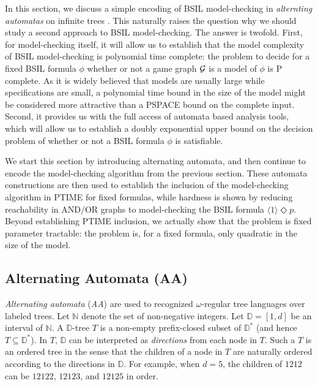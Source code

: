 \documentclass[11pt]{article}
\newcommand{\calg}{{\cal G}}
\newcommand{\pevt}{\Diamond}
\newcommand{\bbbbd}{{\mathbb D}}
\newcommand{\nnneg}{{\mathbb N}}
\begin{document}
In this section, we discuss a simple encoding of BSIL model-checking 
in {\em alternting automatas} on infinite trees 
\cite{Kirsten02,Zappe02}.  
This naturally raises the question why we should study 
a second approach to BSIL model-checking.
The answer is twofold.
First, for model-checking itself, 
it will allow us to establish that the model complexity 
of BSIL model-checking is polynomial time complete:
the problem to decide for a fixed BSIL formula $\phi$ whether 
or not a game graph $\calg$ is a model of $\phi$ is P complete.
As it is widely believed that models are usually large 
while specifications are small, a polynomial time bound in the size 
of the model might be considered more attractive than a PSPACE bound 
on the complete input.
Second, it provides us with the full access of automata 
based analysis tools, which will allow us to establish 
a doubly exponential upper bound on the decision problem of whether 
or not a BSIL formula $\phi$ is satisfiable.

We start this section by introducing alternating automata, 
and then continue to encode the model-checking algorithm 
from the previous section.
These automata constructions are then used to establish 
the inclusion of the model-checking algorithm in PTIME 
for fixed formulas, 
while hardness is shown by reducing reachability 
in AND/OR graphs \cite{Immerman81} to model-checking the BSIL formula 
$\langle 1 \rangle \pevt p$.
Beyond establishing PTIME inclusion, 
we actually show that the problem is fixed parameter tractable: 
the problem is, for a fixed formula, only quadratic in the size 
of the model.


\subsection{Alternating Automata (AA)}

{\em Alternating automata} ({\em AA}) are used 
to recognized $\omega$-regular 
tree languages over labeled trees.  
Let $\nnneg$ denote the set of non-negative integers.  
Let $\bbbbd=[1,d]$ be an interval of $\nnneg$.   
A $\bbbbd$-tree $T$ is a non-empty prefix-closed subset of $\bbbbd^*$ 
(and hence $T \subseteq \bbbbd^*$).  
In $T$, $\bbbbd$ can be interpreted as {\em directions} from 
each node in $T$.  
Such a $T$ is an ordered tree in the sense that 
the children of a node in $T$ are naturally ordered according to 
the directions in $\bbbbd$.   
For example, when $d=5$, 
the children of $1212$ can be $12122$, $12123$, and $12125$ in order. 
\end{document}

